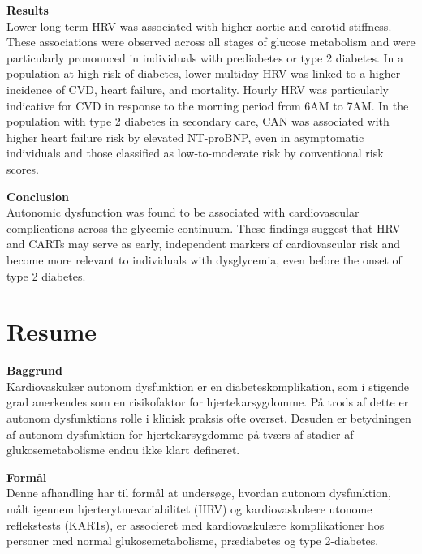 \documentclass[
  a4paper,
  headsepline=true,
  open=left]{scrbook}
\begin{document}
\textbf{Results}\\
Lower long-term HRV was associated with higher aortic and carotid
stiffness. These associations were observed across all stages of glucose
metabolism and were particularly pronounced in individuals with
prediabetes or type 2 diabetes. In a population at high risk of
diabetes, lower multiday HRV was linked to a higher incidence of CVD,
heart failure, and mortality. Hourly HRV was particularly indicative for
CVD in response to the morning period from 6AM to 7AM. In the population
with type 2 diabetes in secondary care, CAN was associated with higher
heart failure risk by elevated NT-proBNP, even in asymptomatic
individuals and those classified as low-to-moderate risk by conventional
risk scores.

\textbf{Conclusion}\\
Autonomic dysfunction was found to be associated with cardiovascular
complications across the glycemic continuum. These findings suggest that
HRV and CARTs may serve as early, independent markers of cardiovascular
risk and become more relevant to individuals with dysglycemia, even
before the onset of type 2 diabetes.

\clearpage
\null
\thispagestyle{empty}
\clearpage


\hypertarget{resume}{%
\chapter*{Resume}\label{resume}}


\clearpage
\null
\thispagestyle{empty}
\clearpage

\textbf{Baggrund}\\
Kardiovaskulær autonom dysfunktion er en diabeteskomplikation, som i
stigende grad anerkendes som en risikofaktor for hjertekarsygdomme. På
trods af dette er autonom dysfunktions rolle i klinisk praksis ofte
overset. Desuden er betydningen af autonom dysfunktion for
hjertekarsygdomme på tværs af stadier af glukosemetabolisme endnu ikke
klart defineret.

\textbf{Formål}\\
Denne afhandling har til formål at undersøge, hvordan autonom
dysfunktion, målt igennem hjerterytmevariabilitet (HRV) og
kardiovaskulære utonome reflekstests (KARTs), er associeret med
kardiovaskulære komplikationer hos personer med normal
glukosemetabolisme, prædiabetes og type 2-diabetes.
\end{document}
